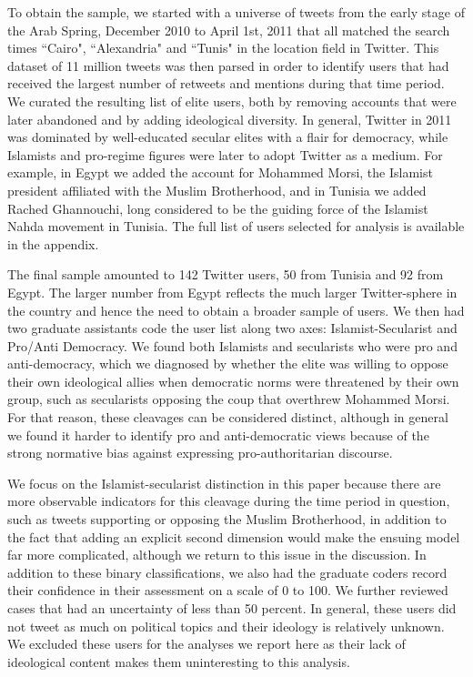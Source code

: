 \documentclass[12pt]{article}
\begin{document}
To obtain the sample, we started with a universe of tweets from the early stage of the Arab Spring, December 2010 to April 1st, 2011 that all matched the search times ``Cairo", ``Alexandria" and ``Tunis" in the location field in Twitter.  This dataset of 11 million tweets was then parsed in order to identify users that had received the largest number of retweets and mentions during that time period. We curated the resulting list of elite users, both by removing accounts that were later abandoned and by adding ideological diversity. In general, Twitter in 2011 was dominated by well-educated secular elites with a flair for democracy, while Islamists and pro-regime figures were later to adopt Twitter as a medium. For example, in Egypt we added the account for Mohammed Morsi, the Islamist president affiliated with the Muslim Brotherhood, and in Tunisia we added Rached Ghannouchi, long considered to be the guiding force of the Islamist Nahda movement in Tunisia. The full list of users selected for analysis is available in the appendix.

The final sample amounted to 142 Twitter users, 50 from Tunisia and 92 from Egypt. The larger number from Egypt reflects the much larger Twitter-sphere in the country and hence the need to obtain a broader sample of users. We then had two graduate assistants code the user list along two axes: Islamist-Secularist and Pro/Anti Democracy. We found both Islamists and secularists who were pro and anti-democracy, which we diagnosed by whether the elite was willing to oppose their own ideological allies when democratic norms were threatened by their own group, such as secularists opposing the coup that overthrew Mohammed Morsi. For that reason, these cleavages can be considered distinct, although in general we found it harder to identify pro and anti-democratic views because of the strong normative bias against expressing pro-authoritarian discourse. 

We focus on the Islamist-secularist distinction in this paper because there are more observable indicators for this cleavage during the time period in question, such as tweets supporting or opposing the Muslim Brotherhood, in addition to the fact that adding an explicit second dimension would make the ensuing model far more complicated, although we return to this issue in the discussion. In addition to these binary classifications, we also had the graduate coders record their confidence in their assessment on a scale of 0 to 100. We further reviewed cases that had an uncertainty of less than 50 percent. In general, these users did not tweet as much on political topics and their ideology is relatively unknown. We excluded these users for the analyses we report here as their lack of ideological content makes them uninteresting to this analysis.
\end{document}

